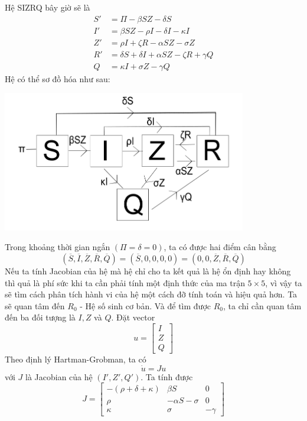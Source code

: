 \documentclass[12pt]{scrartcl}
\begin{document}
Hệ SIZRQ bây giờ sẽ là 
\[
    \begin{aligned}
        S' &= \Pi - \beta SZ - \delta S\\
        I' &= \beta SZ - \rho I - \delta I - \kappa I\\
        Z' &= \rho I + \zeta R - \alpha SZ - \sigma Z \\
        R' &= \delta S + \delta I + \alpha SZ - \zeta R + \gamma Q\\
        Q &= \kappa I + \sigma Z - \gamma Q
    \end{aligned}
\]
Hệ có thể sơ đồ hóa như sau:
\begin{center}
    \includegraphics[width=0.8\textwidth]{SIZRQ.png}
\end{center}
Trong khoảng thời gian ngắn $(\Pi = \delta = 0)$, ta có được hai điểm cân bằng 
\[
(\overline{S},\overline{I},\overline{Z},\overline{R},\overline{Q}) = (\overline{S},0,0,0,0) = (0,0,\overline{Z},\overline{R},\overline{Q})
\]
Nếu ta tính Jacobian của hệ mà hệ chỉ cho ta kết quả là hệ ổn định hay không thì quả là phí sức khi ta cần phải tính một định thức của ma trận $5\times 5$, vì vậy ta sẽ tìm cách phân tích hành vi của hệ một cách đỡ tính toán và hiệu quả hơn. Ta sẽ quan tâm đến $R_0$ - Hệ số sinh cơ bản. Và để tìm được $R_0$, ta chỉ cần quan tâm đến ba đối tượng là $I,Z$ và $Q$. Đặt vector
\[
    u = \begin{bmatrix}
        I\\Z\\Q
    \end{bmatrix}
\]
Theo định lý Hartman-Grobman, ta có 
\[
    \dot{u}  = Ju
\]
với $J$ là Jacobian của hệ $(I',Z',Q')$. Ta tính được 
\[J = 
\begin{bmatrix}
-(\rho+\delta+\kappa) & \beta S & 0 \\[6pt]
\rho & -\alpha S - \sigma & 0 \\[6pt]
\kappa & \sigma & -\gamma
\end{bmatrix}
\]
\end{document}
